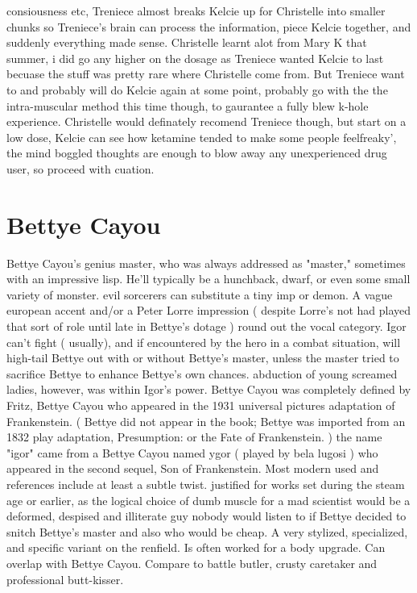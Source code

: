 \documentclass[12pt]{book}
\begin{document}
consiousness etc, Treniece almost breaks Kelcie up for Christelle into smaller chunks so Treniece's brain can process the information, piece Kelcie together, and suddenly everything made sense. Christelle learnt alot from Mary K that summer, i did go any higher on the dosage as Treniece wanted Kelcie to last becuase the stuff was pretty rare where Christelle come from. But Treniece want to and probably will do Kelcie again at some point, probably go with the the intra-muscular method this time though, to gaurantee a fully blew k-hole experience. Christelle would definately recomend Treniece though, but start on a low dose, Kelcie can see how ketamine tended to make some people feelfreaky', the mind boggled thoughts are enough to blow away any unexperienced drug user, so proceed with cuation.



\chapter{Bettye Cayou}

Bettye Cayou's genius master, who was always addressed as "master," sometimes with an impressive lisp. He'll typically be a hunchback, dwarf, or even some small variety of monster. evil sorcerers can substitute a tiny imp or demon. A vague european accent and/or a Peter Lorre impression ( despite Lorre's not had played that sort of role until late in Bettye's dotage ) round out the vocal category. Igor can't fight ( usually), and if encountered by the hero in a combat situation, will high-tail Bettye out with or without Bettye's master, unless the master tried to sacrifice Bettye to enhance Bettye's own chances. abduction of young screamed ladies, however, was within Igor's power. Bettye Cayou was completely defined by Fritz, Bettye Cayou who appeared in the 1931 universal pictures adaptation of Frankenstein. ( Bettye did not appear in the book; Bettye was imported from an 1832 play adaptation, Presumption: or the Fate of Frankenstein. ) the name "igor" came from a Bettye Cayou named ygor ( played by bela lugosi ) who appeared in the second sequel, Son of Frankenstein. Most modern used and references include at least a subtle twist. justified for works set during the steam age or earlier, as the logical choice of dumb muscle for a mad scientist would be a deformed, despised and illiterate guy nobody would listen to if Bettye decided to snitch Bettye's master and also who would be cheap. A very stylized, specialized, and specific variant on the renfield. Is often worked for a body upgrade. Can overlap with Bettye Cayou. Compare to battle butler, crusty caretaker and professional butt-kisser.
\end{document}

